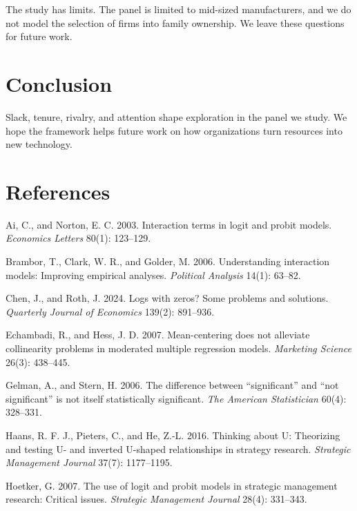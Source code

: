 \documentclass[11pt]{article}
\begin{document}
The study has limits. The panel is limited to mid-sized manufacturers, and we do not model the selection of firms into family ownership. We leave these questions for future work.

\section{Conclusion}

Slack, tenure, rivalry, and attention shape exploration in the panel we study. We hope the framework helps future work on how organizations turn resources into new technology.

\section*{References}
{\small\setlength{\parindent}{-1.5em}\setlength{\leftskip}{1.5em}
\par\vspace{3pt}Ai, C., and Norton, E. C. 2003. Interaction terms in logit and probit models. \emph{Economics Letters} 80(1): 123--129.
\par\vspace{3pt}Brambor, T., Clark, W. R., and Golder, M. 2006. Understanding interaction models: Improving empirical analyses. \emph{Political Analysis} 14(1): 63--82.
\par\vspace{3pt}Chen, J., and Roth, J. 2024. Logs with zeros? Some problems and solutions. \emph{Quarterly Journal of Economics} 139(2): 891--936.
\par\vspace{3pt}Echambadi, R., and Hess, J. D. 2007. Mean-centering does not alleviate collinearity problems in moderated multiple regression models. \emph{Marketing Science} 26(3): 438--445.
\par\vspace{3pt}Gelman, A., and Stern, H. 2006. The difference between ``significant'' and ``not significant'' is not itself statistically significant. \emph{The American Statistician} 60(4): 328--331.
\par\vspace{3pt}Haans, R. F. J., Pieters, C., and He, Z.-L. 2016. Thinking about U: Theorizing and testing U- and inverted U-shaped relationships in strategy research. \emph{Strategic Management Journal} 37(7): 1177--1195.
\par\vspace{3pt}Hoetker, G. 2007. The use of logit and probit models in strategic management research: Critical issues. \emph{Strategic Management Journal} 28(4): 331--343.
}
\end{document}
